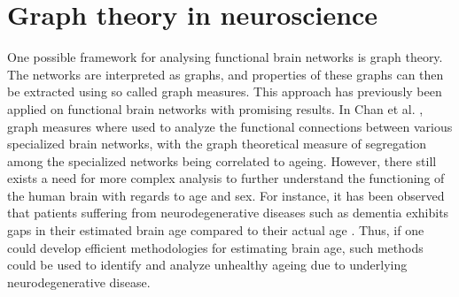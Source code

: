 

\section{Graph theory in neuroscience}

One possible framework for analysing functional brain networks is graph theory. The networks are interpreted as graphs, and properties of these graphs can then be extracted using so called graph measures. This approach has previously been applied on functional brain networks with promising results. In Chan et al. \cite{chan}, graph measures where used to analyze the functional connections between various specialized brain networks, with the graph theoretical measure of segregation among the specialized networks being correlated to ageing. However, there still exists a need for more complex analysis to further understand the functioning of the human brain with regards to age and sex. For instance, it has been observed that patients suffering from neurodegenerative diseases such as dementia exhibits gaps in their estimated brain age compared to their actual age \cite{kaufmann}. Thus, if one could develop efficient methodologies for estimating brain age, such methods could be used to identify and analyze unhealthy ageing due to underlying neurodegenerative disease. 



